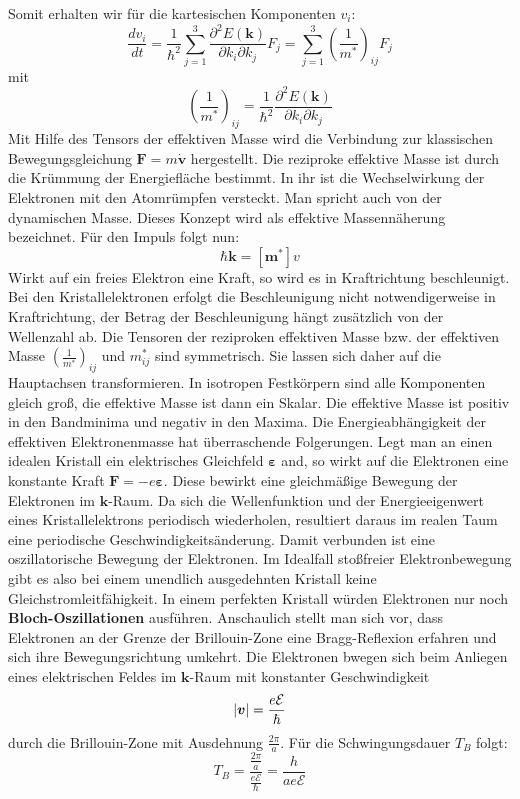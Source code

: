 \documentclass[11pt]{article}
\DeclarePairedDelimiter\abs{\lvert}{\rvert}
\begin{document}
Somit erhalten wir für die kartesischen Komponenten $v_i$:
\begin{equation}
  \frac{dv_i}{dt}=\frac{1}{\hbar^2}\sum_{j=1}^{3}\frac{\partial^2E(\bm{k})}
  {\partial k_i\partial k_j}F_j=\sum_{j=1}^{3}\left(\frac{1}{m^*}\right)_{ij}F_j
\end{equation}
mit
\begin{equation}
  \left(\frac{1}{m^*}\right)_{ij}=\frac{1}{\hbar^2}\frac{\partial^2E(\bm{k})}
  {\partial k_i\partial k_j}
\end{equation}
Mit Hilfe des Tensors der effektiven Masse wird die Verbindung zur klassischen
Bewegungsgleichung $\bm{F}=m\dot{\bm{v}}$ hergestellt. Die reziproke effektive
Masse ist durch die Krümmung der Energiefläche bestimmt. In ihr ist die
Wechselwirkung der Elektronen mit den Atomrümpfen versteckt. Man spricht auch
von der dynamischen Masse. Dieses Konzept wird als effektive Massennäherung
bezeichnet. Für den Impuls folgt nun:
\begin{equation}
  \hbar\bm{k}=[ \bm{m}^*] v
\end{equation}
Wirkt auf ein freies Elektron eine Kraft, so wird es in Kraftrichtung
beschleunigt. Bei den Kristallelektronen erfolgt die Beschleunigung nicht
notwendigerweise in Kraftrichtung, der Betrag der Beschleunigung hängt
zusätzlich von der Wellenzahl ab. Die Tensoren der reziproken effektiven Masse
bzw. der effektiven Masse $\left(\frac{1}{m^*}\right)_{ij}$ und $m^*_{ij}$ sind
symmetrisch. Sie lassen sich daher auf die Hauptachsen transformieren. In
isotropen Festkörpern sind alle Komponenten gleich groß, die effektive Masse ist
dann ein Skalar. Die effektive Masse ist positiv in den Bandminima und negativ
in den Maxima. Die Energieabhängigkeit der effektiven Elektronenmasse hat
überraschende Folgerungen. Legt man an einen idealen Kristall ein elektrisches
Gleichfeld $\bm{\varepsilon}$ and, so wirkt auf die Elektronen eine konstante
Kraft $\bm{F}=-e\bm{\varepsilon}$. Diese bewirkt eine gleichmäßige Bewegung
der Elektronen im $\bm{k}$-Raum. Da sich die Wellenfunktion und der
Energieeigenwert eines Kristallelektrons periodisch wiederholen, resultiert
daraus im realen Taum eine periodische Geschwindigkeitsänderung. Damit verbunden
ist eine oszillatorische Bewegung der Elektronen. Im Idealfall stoßfreier
Elektronbewegung gibt es also bei einem unendlich ausgedehnten Kristall keine
Gleichstromleitfähigkeit. In einem perfekten Kristall würden Elektronen nur noch
\textbf{Bloch-Oszillationen} ausführen. Anschaulich stellt man sich vor, dass
Elektronen an der Grenze der Brillouin-Zone eine Bragg-Reflexion erfahren und
sich ihre Bewegungsrichtung umkehrt. Die Elektronen bwegen sich beim Anliegen
eines elektrischen Feldes im $\bm{k}$-Raum mit konstanter Geschwindigkeit
\begin{equation}
  \abs{\bm{v}}=\frac{e\mathcal{E}}{\hbar}
\end{equation}
durch die Brillouin-Zone mit Ausdehnung $\frac{2\pi}{a}$. Für die
Schwingungsdauer $T_B$ folgt:
\begin{equation}
  T_B=\frac{\frac{2\pi}{a}}{\frac{e\mathcal{E}}{\hbar}}=\frac{h}{ae\mathcal{E}}
\end{equation}
\end{document}

